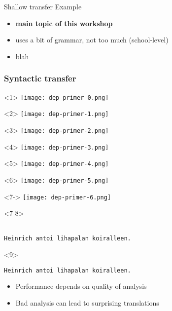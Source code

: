 \documentclass{beamer}
\begin{document}
\begin{frame}{Shallow transfer}
    Example
    \begin{itemize}
        \item \textbf{main topic of this workshop}
        \item uses a bit of grammar, not too much (school-level)
        \item blah
    \end{itemize}
\end{frame}

\begin{frame}[fragile]
  \frametitle{Syntactic transfer}
\begin{center}
\end{center}
\begin{onlyenv}<1>
\texttt{[image: dep-primer-0.png]}
\end{onlyenv}
\begin{onlyenv}<2>
\texttt{[image: dep-primer-1.png]}
\end{onlyenv}
\begin{onlyenv}<3>
\texttt{[image: dep-primer-2.png]}
\end{onlyenv}
\begin{onlyenv}<4>
\texttt{[image: dep-primer-3.png]}
\end{onlyenv}
\begin{onlyenv}<5>
\texttt{[image: dep-primer-4.png]}
\end{onlyenv}
\begin{onlyenv}<6>
\texttt{[image: dep-primer-5.png]}
\end{onlyenv}
\begin{onlyenv}<7->
\texttt{[image: dep-primer-6.png]}
\end{onlyenv}
\begin{onlyenv}<7-8>
~\\
~\\

\begin{verbatim}
Heinrich antoi lihapalan koiralleen.
\end{verbatim}
\end{onlyenv}
\begin{onlyenv}<9>
\begin{verbatim}
Heinrich antoi lihapalan koiralleen.
\end{verbatim}
\begin{itemize}
  \item Performance depends on quality of analysis
  \item Bad analysis can lead to surprising translations
\end{itemize}
\end{onlyenv}



\end{frame}
\end{document}
